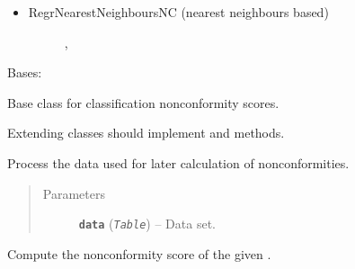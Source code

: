 \documentclass[letterpaper,10pt,english]{sphinxmanual}
\begin{document}
\begin{itemize}
\begin{description}
\begin{itemize}
\begin{description}
\end{description}

\item {} \begin{description}
\item[{RegrNearestNeighboursNC (nearest neighbours based)}] \leavevmode
{\hyperref[cp.nonconformity:cp.nonconformity.AbsErrorKNN]{}}, {\hyperref[cp.nonconformity:cp.nonconformity.AvgErrorKNN]{}}

\end{description}

\end{itemize}

\end{description}

\end{itemize}

\begin{fulllineitems}
\label{cp.nonconformity:cp.nonconformity.ClassNC}
Bases: 

Base class for classification nonconformity scores.

Extending classes should implement {\hyperref[cp.nonconformity:cp.nonconformity.ClassNC.fit]{}} and {\hyperref[cp.nonconformity:cp.nonconformity.ClassNC.nonconformity]{}} methods.

\begin{fulllineitems}
\label{cp.nonconformity:cp.nonconformity.ClassNC.fit}
Process the data used for later calculation of nonconformities.
\begin{quote}\begin{description}
\item[{Parameters}] \leavevmode
\textbf{\texttt{data}} (\emph{\texttt{Table}}) -- Data set.

\end{description}\end{quote}

\end{fulllineitems}


\begin{fulllineitems}
\label{cp.nonconformity:cp.nonconformity.ClassNC.nonconformity}
Compute the nonconformity score of the given .

\end{fulllineitems}


\end{fulllineitems}
\end{document}
